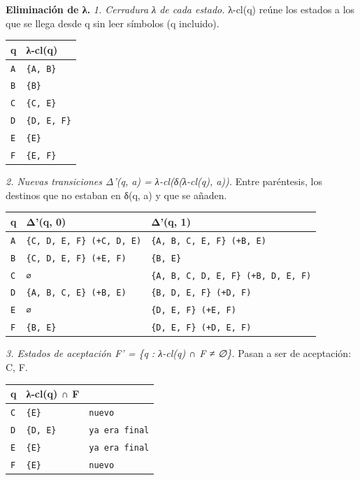 \documentclass[11pt]{article}
\begin{document}
\textbf{Eliminación de λ.} \textit{1. Cerradura λ de cada estado.} λ-cl(q) reúne los estados a los que se llega desde q sin leer símbolos (q incluido).
\begin{center}\footnotesize\begin{tabular}{ll}\toprule
q & λ-cl(q) \\\midrule
\texttt{A} & \texttt{\{A, B\}} \\
\texttt{B} & \texttt{\{B\}} \\
\texttt{C} & \texttt{\{C, E\}} \\
\texttt{D} & \texttt{\{D, E, F\}} \\
\texttt{E} & \texttt{\{E\}} \\
\texttt{F} & \texttt{\{E, F\}} \\
\bottomrule\end{tabular}\end{center}
\textit{2. Nuevas transiciones Δ'(q, a) = λ-cl(δ(λ-cl(q), a)).} Entre paréntesis, los destinos que no estaban en δ(q, a) y que se añaden.
\begin{center}\footnotesize\begin{tabular}{lll}\toprule
q & Δ'(q, 0) & Δ'(q, 1) \\\midrule
\texttt{A} & \texttt{\{C, D, E, F\}  (+C, D, E)} & \texttt{\{A, B, C, E, F\}  (+B, E)} \\
\texttt{B} & \texttt{\{C, D, E, F\}  (+E, F)} & \texttt{\{B, E\}} \\
\texttt{C} & \texttt{∅} & \texttt{\{A, B, C, D, E, F\}  (+B, D, E, F)} \\
\texttt{D} & \texttt{\{A, B, C, E\}  (+B, E)} & \texttt{\{B, D, E, F\}  (+D, F)} \\
\texttt{E} & \texttt{∅} & \texttt{\{D, E, F\}  (+E, F)} \\
\texttt{F} & \texttt{\{B, E\}} & \texttt{\{D, E, F\}  (+D, E, F)} \\
\bottomrule\end{tabular}\end{center}
\textit{3. Estados de aceptación F' = \{q : λ-cl(q) ∩ F ≠ ∅\}.} Pasan a ser de aceptación: C, F.
\begin{center}\footnotesize\begin{tabular}{lll}\toprule
q & λ-cl(q) ∩ F &  \\\midrule
\texttt{C} & \texttt{\{E\}} & \texttt{nuevo} \\
\texttt{D} & \texttt{\{D, E\}} & \texttt{ya era final} \\
\texttt{E} & \texttt{\{E\}} & \texttt{ya era final} \\
\texttt{F} & \texttt{\{E\}} & \texttt{nuevo} \\
\bottomrule\end{tabular}\end{center}
\end{document}
